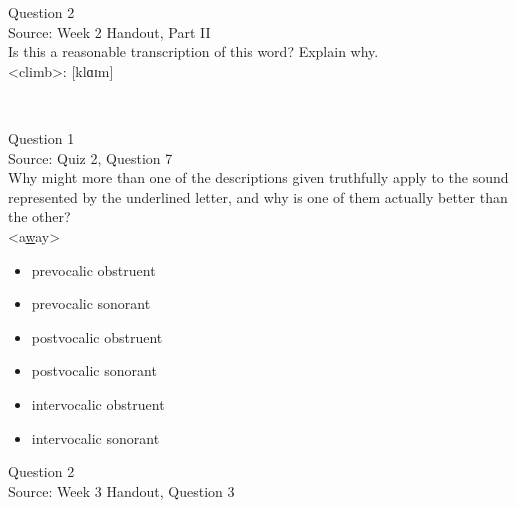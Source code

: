\documentclass[12pt]{article}
\begin{document}
\newpage

{\large Question 2}\\

Source: Week 2 Handout, Part II\\

Is this a reasonable transcription of this word? Explain why.\\

<climb>: {[klɑɪm]}


\newpage

\begin{center}
\textbf{{\color{red}{\HUGE END OF EXAM}}}\\

\end{center}
\newpage

\begin{center}
\textbf{{\color{blue}{\HUGE START OF EXAM\\}}}

\textbf{{\color{blue}{\HUGE Student ID: 38415\\}}}

\textbf{{\color{blue}{\HUGE 4:30\\}}}

\end{center}
\newpage

{\large Question 1}\\

Source: Quiz 2, Question 7\\

Why might more than one of the descriptions given truthfully apply to the sound represented by the underlined letter, and why is one of them actually better than the other?\\

<a\underline{w}ay>

\begin{itemize} \item prevocalic obstruent \item prevocalic sonorant \item postvocalic obstruent \item postvocalic sonorant \item intervocalic obstruent \item intervocalic sonorant \end{itemize}


\newpage

{\large Question 2}\\

Source: Week 3 Handout, Question 3\\
\end{document}
